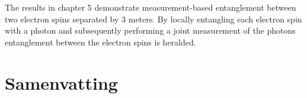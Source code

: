 The results in chapter 5 demonstrate measurement-based entanglement between two electron spins separated by 3 meters. By locally entangling each electron spin with a photon and subsequently performing a joint measurement of the photons entanglement between the electron spins is heralded.

\chapter{Samenvatting}